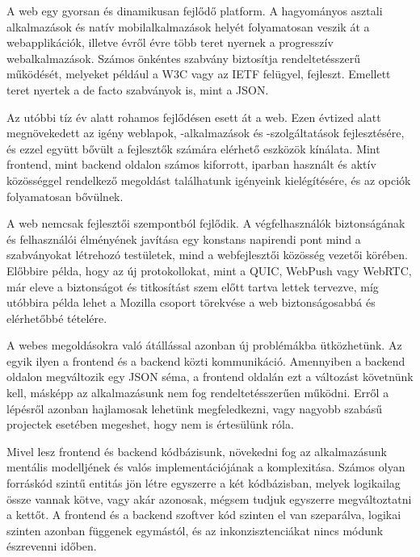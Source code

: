 A web egy gyorsan és dinamikusan fejlődő platform. A hagyományos asztali alkalmazások és natív mobilalkalmazások helyét folyamatosan veszik át a webapplikációk, illetve évről évre több teret nyernek a progresszív webalkalmazások. Számos önkéntes szabvány biztosítja rendeltetésszerű működését, melyeket például a W3C vagy az IETF felügyel, fejleszt. Emellett teret nyertek a de facto szabványok is, mint a JSON.\par

Az utóbbi tíz év alatt rohamos fejlődésen esett át a web. Ezen évtized alatt megnövekedett az igény weblapok, -alkalmazások és -szolgáltatások fejlesztésére, és ezzel együtt bővült a fejlesztők számára elérhető eszközök kínálata. Mint frontend, mint backend oldalon számos kiforrott, iparban használt és aktív közösséggel rendelkező megoldást találhatunk igényeink kielégítésére, és az opciók folyamatosan bővülnek. \par

A web nemcsak fejlesztői szempontból fejlődik. A végfelhasználók biztonságának és felhasználói élményének javítása egy konstans napirendi pont mind a szabványokat létrehozó testületek, mind a webfejlesztői közösség vezetői körében. Előbbire példa, hogy az új protokollokat, mint a QUIC, WebPush vagy WebRTC, már eleve a biztonságot és titkosítást szem előtt tartva lettek tervezve, míg utóbbira példa lehet a Mozilla csoport törekvése a web biztonságosabbá és elérhetőbbé tételére. \cite{mozillaVision}\par

A webes megoldásokra való átállással azonban új problémákba ütközhetünk. Az egyik ilyen a frontend és a backend közti kommunikáció. Amennyiben a backend oldalon megváltozik egy JSON séma, a frontend oldalán ezt a változást követnünk kell, másképp az alkalmazásunk nem fog rendeltetésszerűen működni. Erről a lépésről azonban hajlamosak lehetünk megfeledkezni, vagy nagyobb szabásű projectek esetében megeshet, hogy nem is értesülünk róla. \par 

Mivel lesz frontend és backend kódbázisunk, növekedni fog az alkalmazásunk mentális modelljének és valós implementációjának a komplexitása. Számos olyan forráskód szintű entitás jön létre egyszerre a két kódbázisban, melyek logikailag össze vannak kötve, vagy akár azonosak, mégsem tudjuk egyszerre megváltoztatni a kettőt. A frontend és a backend szoftver kód szinten el van szeparálva, logikai szinten azonban függenek egymástól, és az inkonzisztenciákat nincs módunk észrevenni időben.\par

